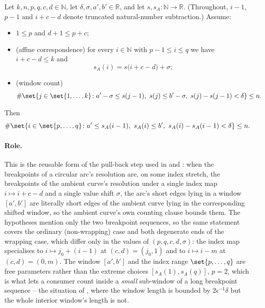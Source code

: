 \begin{helper}
  Let $k,n,p,q,c,d \in \mathbb{N}$, let $\delta,\sigma,a',b' \in \mathbb{R}$, and let
  $s, s_A \colon \mathbb{N} \to \mathbb{R}$. (Throughout, $i-1$, $p-1$ and $i+c-d$ denote
  truncated natural-number subtraction.) Assume:
  \begin{itemize}
    \item $1 \le p$ and $d + 1 \le p + c$;
    \item (affine correspondence) for every $i \in \mathbb{N}$ with $p-1 \le i \le q$ we have
      $i + c - d \le k$ and
      \[
        s_A(i) = s\bigl(i + c - d\bigr) + \sigma
        ;
      \]
    \item (window count)
      \[
        \#\set{ j \in \set{1,\dots,k} \colon a'-\sigma \le s(j-1),\ s(j) \le b'-\sigma,\
          s(j)-s(j-1) < \delta }
        \le n
        .
      \]
  \end{itemize}
  Then
  \[
    \#\set{ i \in \set{p,\dots,q} \colon a' \le s_A(i-1),\ s_A(i) \le b',\
      s_A(i) - s_A(i-1) < \delta } \le n
    .
  \]

  \paragraph{Role.} This is the reusable form of the pull-back step used in
   and : when the breakpoints of a
  circular arc's resolution are, on some index stretch, the breakpoints of the ambient curve's
  resolution under a single index map $i \mapsto i+c-d$ and a single value shift $\sigma$, the
  arc's short edges lying in a window $[a',b']$ are literally short edges of the ambient curve
  lying in the corresponding shifted window, so the ambient curve's own counting clause bounds
  them. The hypotheses mention only the two breakpoint sequences, so the same statement covers the
  ordinary (non-wrapping) case and both degenerate ends of the wrapping case, which differ only in
  the values of $(p,q,c,d,\sigma)$: the index map specialises to $i \mapsto j_0+(i-1)$ at
  $(c,d)=(j_0,1)$ and to $i \mapsto i-m$ at $(c,d)=(0,m)$. The window $[a',b']$ and the index range
  $\set{p,\dots,q}$ are free parameters rather than the extreme choices
  $[s_A(1),s_A(q)]$, $p=2$, which is what lets a consumer count inside a \emph{small} sub-window of
  a long breakpoint sequence -- the situation of , where the window
  length is bounded by $2\epsilon^{-1}\delta$ but the whole interior window's length is not.
\end{helper}
